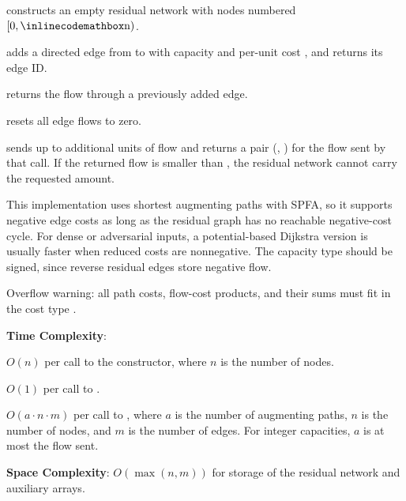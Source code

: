\begin{compactitem}
  \item {} constructs an empty residual network with nodes numbered $[0, {\inlinecodemath{n}})$.
  \item {} adds a directed edge from  to  with capacity  and per-unit cost , and returns its edge ID.
  \item {} returns the flow through a previously added edge.
  \item {} resets all edge flows to zero.
  \item {} sends up to  additional units of flow and returns a pair (, ) for the flow sent by that call. If the returned flow is smaller than , the residual network cannot carry the requested amount.
\end{compactitem}

This implementation uses shortest augmenting paths with SPFA, so it supports negative edge costs as long as the residual graph has no reachable negative-cost cycle. For dense or adversarial inputs, a potential-based Dijkstra version is usually faster when reduced costs are nonnegative. The capacity type  should be signed, since reverse residual edges store negative flow.

Overflow warning: all path costs, flow-cost products, and their sums must fit in the cost type .

\textbf{Time Complexity}:
\begin{compactitem}
  \item $O(n)$ per call to the constructor, where $n$ is the number of nodes.
  \item $O(1)$ per call to .
  \item $O(a \cdot n \cdot m)$ per call to , where $a$ is the number of augmenting paths, $n$ is the number of nodes, and $m$ is the number of edges. For integer capacities, $a$ is at most the flow sent.
\end{compactitem}

\textbf{Space Complexity}: $O(\max\left(n, m\right))$ for storage of the residual network and auxiliary arrays.

